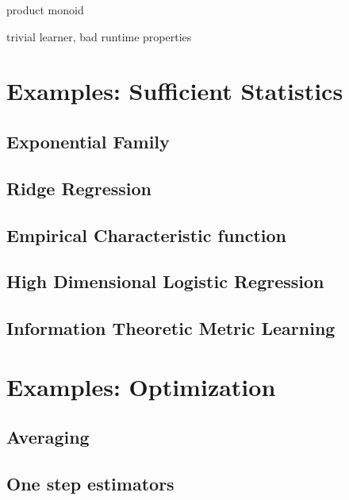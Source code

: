 \documentclass[thesis.tex]{subfiles}
\begin{document}
\begin{example}
    product monoid
\end{example}

\begin{example}
    trivial learner, bad runtime properties
\end{example}


\section{Examples: Sufficient Statistics}

\subsection{Exponential Family}

\subsection{Ridge Regression}

\subsection{Empirical Characteristic function}
\cite{yu2004empirical}

\subsection{High Dimensional Logistic Regression}

\subsection{Information Theoretic Metric Learning}


\section{Examples: Optimization}

\subsection{Averaging}

\subsection{One step estimators}
\end{document}
